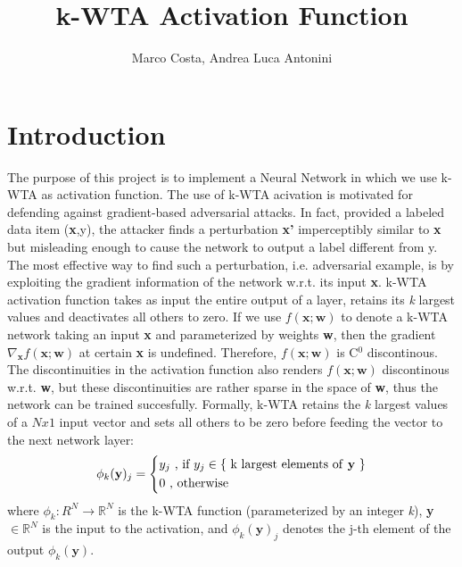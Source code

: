 \documentclass[a4paper]{article}
\title{k-WTA Activation Function}
\author{Marco Costa, Andrea Luca Antonini}
\begin{document}
\maketitle

\section{Introduction}
The purpose of this project is to implement a Neural Network in which we use k-WTA as activation function. \newline
The use of k-WTA acivation is motivated for defending against gradient-based adversarial attacks. In fact, provided a labeled data item (\textbf{x},y), the attacker finds a perturbation \textbf{x'} imperceptibly similar to \textbf{x} but misleading enough to cause the network to output a label different from y. The most effective way to find such a perturbation, i.e. adversarial example, is by exploiting the gradient information of the network w.r.t. its input \textbf{x}. \newline
k-WTA activation function takes as input the entire output of a layer, retains its \textit{k} largest values and deactivates all others to zero. If we use $f(\textbf{x};\textbf{w})$ to denote a k-WTA network taking an input \textbf{x} and parameterized by weights \textbf{w}, then the gradient $\nabla_{\textbf{x}}f(\textbf{x};\textbf{w})$ at certain \textbf{x} is undefined. Therefore, $f(\textbf{x};\textbf{w})$ is C$^0$ discontinous. The discontinuities in the activation function also renders $f(\textbf{x};\textbf{w})$ discontinous w.r.t. \textbf{w}, but these discontinuities are rather sparse in the space of \textbf{w}, thus the network can be trained succesfully. \newline
Formally, k-WTA retains the \textit{k} largest values of a $Nx1$ input vector and sets all others to be zero before feeding the vector to the next network layer:
\begin{equation}
\phi_{k}(\textbf{y})_{j} = 
\begin{cases*}
y_{j}$ , if $y_{j} \in\{$ k largest elements of \textbf{y} $\} \\
0$ , otherwise$
\end{cases*}
\end{equation}
where $\phi_{k}: \mathbb{}{R}^{N} \rightarrow \mathbb{R}^{N}$ is the k-WTA function (parameterized by an integer \textit{k}), \textbf{y} $\in \mathbb{R}^{N}$ is the input to the activation, and $\phi_{k}(\textbf{y})_{j}$ denotes the j-th element of the output $\phi_{k}(\textbf{y})$.\\
\end{document}
